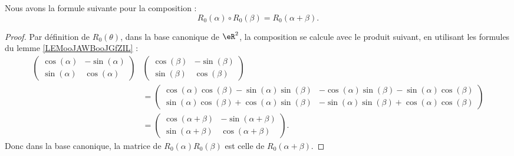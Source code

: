 \begin{proposition}     \label{PROPooISUCooRYJcwo}
	Nous avons la formule suivante pour la composition :
	\begin{equation}
		R_0(\alpha)\circ R_0(\beta)=R_0(\alpha+\beta).
	\end{equation}
\end{proposition}

\begin{proof}
	Par définition de \( R_0(\theta)\), dans la base canonique de \( \eR^2\), la composition se calcule avec le produit suivant, en utilisant les formules du lemme \ref{LEMooJAWBooJGfZIL} :
	\begin{subequations}
		\begin{align}
			\begin{pmatrix}
				\cos(\alpha) & -\sin(\alpha) \\
				\sin(\alpha) & \cos(\alpha)
			\end{pmatrix} & \begin{pmatrix}
				                \cos(\beta) & -\sin(\beta) \\
				                \sin(\beta) & \cos(\beta)
			                \end{pmatrix}                                                                                              \\
			                                & =\begin{pmatrix}
				                                   \cos(\alpha)\cos(\beta)  -\sin(\alpha)\sin(\beta) & -\cos(\alpha)\sin(\beta)-\sin(\alpha)\cos(\beta) \\
				                                   \sin(\alpha)\cos(\beta)+\cos(\alpha)\sin(\beta)   & -\sin(\alpha)\sin(\beta)+\cos(\alpha)\cos(\beta)
			                                   \end{pmatrix} \\
			                                & =\begin{pmatrix}
				                                   \cos(\alpha+\beta) & -\sin(\alpha+\beta) \\
				                                   \sin(\alpha+\beta) & \cos(\alpha+\beta)
			                                   \end{pmatrix}.
		\end{align}
	\end{subequations}
	Donc dans la base canonique, la matrice de \( R_0(\alpha)R_0(\beta)\) est celle de \( R_0(\alpha+\beta)\).
\end{proof}

